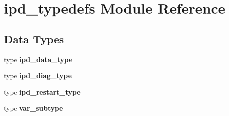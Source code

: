 \section{ipd\+\_\+typedefs Module Reference}
\label{namespaceipd__typedefs}
\subsection*{Data Types}
\begin{DoxyCompactItemize}
\item 
type \textbf{ ipd\+\_\+data\+\_\+type}
\item 
type \textbf{ ipd\+\_\+diag\+\_\+type}
\item 
type \textbf{ ipd\+\_\+restart\+\_\+type}
\item 
type \textbf{ var\+\_\+subtype}
\end{DoxyCompactItemize}
